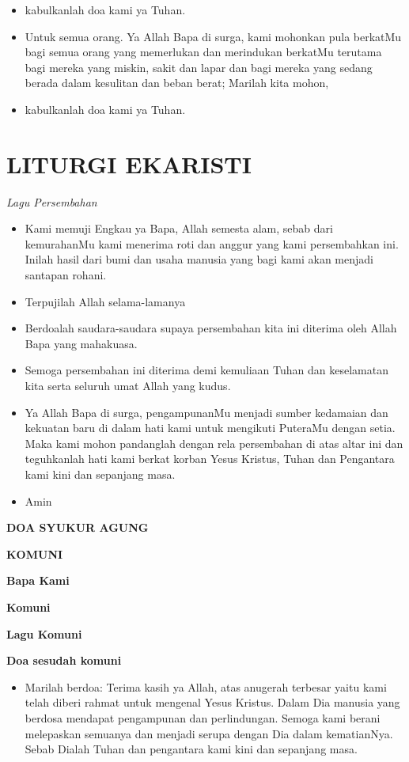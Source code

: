 \documentclass[a5paper,headsepline,titlepage,11pt,nnormalheadings,DIVcalc]{scrbook}
\makeatletter
\newcommand{\subjudul}[1]{%
  {\parindent \z@ 
    \interlinepenalty\@M \bfseries #1\par\nobreak \vskip 10\p@ }}
\newcommand{\lagu}[1]{%
  {\parindent \z@ 
    \interlinepenalty\@M \slshape \mdseries \Large \textit{#1}\par\nobreak \vskip 10\p@ }}
\newcommand{\BU}[1]{\begin{itemize} \item[U:] #1 \end{itemize}}
\newcommand{\BI}[1]{\begin{itemize} \item[I:] #1 \end{itemize}}
\newcommand{\BP}[1]{\begin{itemize} \item[P:] #1 \end{itemize}}
\makeatother
\begin{document}
\BU{kabulkanlah doa kami ya Tuhan.} 

\BP{Untuk semua orang. Ya Allah Bapa di surga, kami mohonkan 
pula berkatMu bagi semua orang yang memerlukan dan 
merindukan berkatMu terutama bagi mereka yang miskin, 
sakit dan lapar dan bagi mereka yang sedang berada dalam 
kesulitan dan beban berat; Marilah kita mohon,}

\BU{kabulkanlah doa kami ya Tuhan.} 

\section*{LITURGI EKARISTI}

\lagu{Lagu Persembahan}

\BI{Kami memuji Engkau ya Bapa, Allah semesta alam, sebab 
dari kemurahanMu kami menerima roti dan anggur yang 
kami persembahkan ini. Inilah hasil dari bumi dan usaha 
manusia yang bagi kami akan menjadi santapan rohani.}

\BU{Terpujilah Allah selama-lamanya}

\BI{Berdoalah saudara-saudara supaya persembahan kita ini 
diterima oleh Allah Bapa yang mahakuasa.}

\BU{Semoga persembahan ini diterima demi kemuliaan Tuhan 
dan keselamatan kita serta seluruh umat Allah yang kudus.}

\BI{Ya Allah Bapa di surga, pengampunanMu menjadi sumber 
kedamaian dan kekuatan baru di dalam hati kami untuk 
mengikuti PuteraMu dengan setia. Maka kami mohon 
pandanglah dengan rela persembahan di atas altar ini dan 
teguhkanlah hati kami berkat korban Yesus Kristus, Tuhan 
dan Pengantara kami kini dan sepanjang masa.}

\BU{Amin} 

\subjudul{DOA SYUKUR AGUNG}

\subjudul{KOMUNI}

\subjudul{Bapa Kami}

\subjudul{Komuni}

\subjudul{Lagu Komuni}
 
\subjudul{Doa sesudah komuni}

\BI{Marilah berdoa: Terima kasih ya Allah, atas anugerah 
terbesar yaitu kami telah diberi rahmat untuk mengenal 
Yesus Kristus. Dalam Dia manusia yang berdosa mendapat 
pengampunan dan perlindungan. Semoga kami berani 
melepaskan semuanya dan menjadi serupa dengan Dia 
dalam kematianNya. Sebab Dialah Tuhan dan pengantara 
kami kini dan sepanjang masa.}
\end{document}
